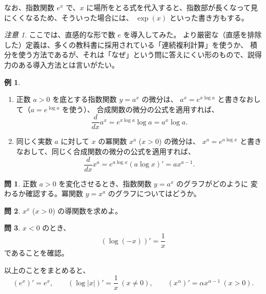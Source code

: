 \documentclass[a4paper]{jsarticle}
\theoremstyle{definition}
\newtheorem{Example}[Theorem]{例}
\newtheorem{Exercise}{問}%
\theoremstyle{remark}
\newtheorem{Remark}{注意}
\begin{document}
なお、指数関数 $e^x$ で、$x$ に場所をとる式を代入すると、指数部が長くなって見にくくなるため、そういった場合には、
$\exp(x)$ といった書き方もする。


\begin{Remark}
{\small
ここでは、直感的な形で数 $e$ を導入してみた。
より厳密な（直感を排除した）定義は、多くの教科書に採用されている「連続複利計算」を使うか、
積分を使う方法であるが、それは「なぜ」という問に答えにくい形のもので、説得力のある導入方法とは言いがたい。}
\end{Remark}

\begin{Example}~
\begin{enumerate}
\item
正数%
$a>0$ を底とする指数関数 $y = a^x$ の微分は、
$a^x = e^{x\log a}$ と書きなおして（$a = e^{\log a}$ を使う）、
合成関数の微分の公式を適用すれば、
\[
\frac{d}{dx} a^x = e^{x\log a} \log a = a^x\log a. 
\]
\item
同じく実数 $a$ に対して $x$ の冪関数 $x^a$ ($x>0$) の微分は、
$x^a = e^{a\log x}$ と書きなおして、同じく合成関数の微分の公式を適用すれば、
\[
\frac{d}{dx} x^a = e^{a\log x} (a\log x)' = ax^{a-1}. 
\]
\end{enumerate}
\end{Example}

\begin{Exercise}
正数 $a>0$ を変化させるとき、指数関数 $y = a^x$ のグラフがどのように
変わるか確認する。冪関数 $y = x^a$ のグラフについてはどうか。
\end{Exercise}

\begin{Exercise}
$x^x$ ($x>0$) の導関数を求めよ。
\end{Exercise}

\begin{Exercise}
$x<0$ のとき、
\[
\left( \log(-x)\right)' = \frac{1}{x}
\]
であることを確認。
\end{Exercise}

以上のことをまとめると、
\[
(e^x)' = e^x,\qquad (\log |x|)' = \frac{1}{x}\ (x\not=0),\qquad
(x^\alpha)' = \alpha x^{\alpha -1}\ (x>0).
\]
\end{document}
